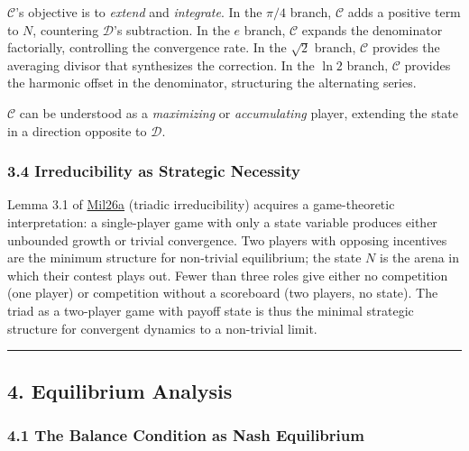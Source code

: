 \documentclass[
  11pt,
  letterpaper,
]{article}
\begin{document}
\(\mathcal{C}\)'s objective is to \emph{extend} and \emph{integrate}. In
the \(\pi/4\) branch, \(\mathcal{C}\) adds a positive term to \(N\),
countering \(\mathcal{D}\)'s subtraction. In the \(e\) branch,
\(\mathcal{C}\) expands the denominator factorially, controlling the
convergence rate. In the \(\sqrt{2}\) branch, \(\mathcal{C}\) provides
the averaging divisor that synthesizes the correction. In the \(\ln 2\)
branch, \(\mathcal{C}\) provides the harmonic offset in the denominator,
structuring the alternating series.

\(\mathcal{C}\) can be understood as a \emph{maximizing} or
\emph{accumulating} player, extending the state in a direction opposite
to \(\mathcal{D}\).

\subsubsection{3.4 Irreducibility as Strategic
Necessity}\label{irreducibility-as-strategic-necessity}

Lemma 3.1 of
\href{https://github.com/baardev/truevalue/blob/main/docnav/Research/papers/1_recursive-tholonic-five-constants/1_recursive-tholonic-five-constants.pdf}{Mil26a}
(triadic irreducibility) acquires a game-theoretic interpretation: a
single-player game with only a state variable produces either unbounded
growth or trivial convergence. Two players with opposing incentives are
the minimum structure for non-trivial equilibrium; the state \(N\) is
the arena in which their contest plays out. Fewer than three roles give
either no competition (one player) or competition without a scoreboard
(two players, no state). The triad as a two-player game with payoff
state is thus the minimal strategic structure for convergent dynamics to
a non-trivial limit.

\begin{center}\rule{0.5\linewidth}{0.5pt}\end{center}

\subsection{4. Equilibrium Analysis}\label{equilibrium-analysis}

\subsubsection{4.1 The Balance Condition as Nash
Equilibrium}\label{the-balance-condition-as-nash-equilibrium}
\end{document}
